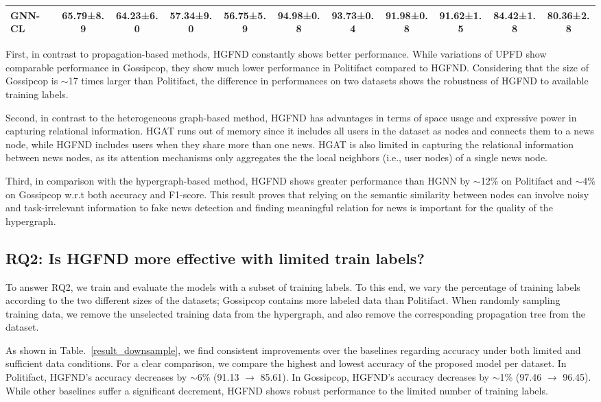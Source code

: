 \documentclass[conference]{IEEEtran}
\begin{document}
\begin{table*}[!htbp]
\begin{tabular}{lcccccccccc}
GNN-CL        &  65.79±8.9   &     64.23±6.0      &     57.34±9.0      &      56.75±5.9     &   94.98±0.8& 93.73±0.4  &     91.98±0.8      &     91.62±1.5      &    84.42±1.8 &80.36±2.8     \\
\hline
\end{tabular}
\end{table*}


First, in contrast to propagation-based methods, HGFND constantly shows better performance. While variations of UPFD show comparable performance in Gossipcop, they show much lower performance in Politifact compared to HGFND. Considering that the size of Gossipcop is $\sim$17 times larger than Politifact, the difference in performances on two datasets shows the robustness of HGFND to available training labels.

Second, in contrast to the heterogeneous graph-based method, HGFND has advantages in terms of space usage and expressive power in capturing relational information. HGAT runs out of memory since it includes all users in the dataset as nodes and connects them to a news node, while HGFND includes users when they share more than one news. HGAT is also limited in capturing the relational information between news nodes, as its attention mechanisms only aggregates the the local neighbors (i.e., user nodes) of a single news node.

Third, in comparison with the hypergraph-based method, HGFND shows greater performance than HGNN by $\sim$12\% on Politifact and $\sim$4\% on Gossipcop w.r.t both accuracy and F1-score. This result proves that relying on the semantic similarity between nodes can involve noisy and task-irrelevant information to fake news detection and finding meaningful relation for news is important for the quality of the hypergraph.

\subsection{RQ2: Is HGFND more effective with limited train labels?}


To answer RQ2, we train and evaluate the models with a subset of training labels. To this end, we vary the percentage of training labels according to the two different sizes of the datasets; Gossipcop contains more labeled data than Politifact. When randomly sampling training data, we remove the unselected training data from the hypergraph, and also remove the corresponding propagation tree from the dataset.

As shown in Table.~\ref{result_downsample}, we find consistent improvements over the baselines regarding accuracy under both limited and sufficient data conditions. For a clear comparison, we compare the highest and lowest accuracy of the proposed model per dataset. In Politifact, HGFND's accuracy decreases by $\sim$6\% (91.13 $\rightarrow$ 85.61). In Gossipcop, HGFND's accuracy decreases by $\sim$1\% (97.46 $\rightarrow$ 96.45). While other baselines suffer a significant decrement, HGFND shows robust performance to the limited number of training labels.
\end{document}
